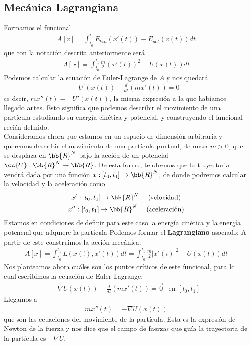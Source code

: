 \subsection{Mecánica Lagrangiana}
Formamos el funcional
\begin{gather*}
    A[x] = \int_{t_0}^{t_1} E_{kin}(x'(t)) - E_{pot}(x(t)) dt
\end{gather*}
que con la notación descrita anteriormente será
\begin{gather*}
    A[x] = \int_{t_0}^{t_1} \frac{m}{2} (x'(t))^2 - U(x(t)) dt
\end{gather*}
Podemos calcular la ecuación de Euler-Lagrange de $A$ y nos quedará
\begin{gather*}
    -U'(x(t)) - \frac{d}{dt} (mx'(t)) = 0
\end{gather*}
es decir, $mx''(t) = -U'(x(t))$, la misma expresión a la que habíamos llegado antes. Esto significa que podemos describir el movimiento de una partícula estudiando su energía cinética y potencial, y construyendo el funcional recién definido.\\

Consideramos ahora que estamos en un espacio de dimensión arbitraria y queremos describir el movimiento de una partícula puntual, de masa $m>0$, que se desplaza en $\bb{R}^N$ bajo la acción de un potencial $\cc{U}:\bb{R}^N \to \bb{R}$. De esta forma, tendremos que la trayectoria vendrá dada por una función $x:[t_0,t_1] \to \bb{R}^N$, de donde podremos calcular la velocidad y la aceleración como 
\begin{gather*}
    x':[t_0,t_1] \to \bb{R}^N \ \ \ \ \text{(velocidad)}\\
    x'':[t_0,t_1] \to \bb{R}^N \ \ \ \ \text{(aceleración)}
\end{gather*}
Estamos en condiciones de definir para este caso la energía cinética y la energía potencial que adquiere la partícula
Podemos formar el \textbf{Lagrangiano} asociado:
A partir de este construimos la acción mecánica:
\begin{gather*}
    A[x] = \int_{t_0}^{t_1} L(x(t), x'(t)) dt = \int_{t_0}^{t_1} \frac{m}{2} |x'(t)|^2 - U(x(t)) dt
\end{gather*}
Nos planteamos ahora cuáles son los puntos críticos de este funcional, para lo cual escribimos la ecuación de Euler-Lagrange:
\begin{gather*}
    -\nabla U(x(t)) -\frac{d}{dt} (mx'(t)) = \vec{0} \ \ \text{ en } [t_0, t_1]
\end{gather*}
Llegamos a 
\begin{gather*}
    mx''(t) = -\nabla U(x(t))
\end{gather*}
que son las ecuaciones del movimiento de la partícula. Esta es la expresión de Newton de la fuerza y nos dice que el campo de fuerzas que guía la trayectoria de la partícula es $-\nabla U$.

